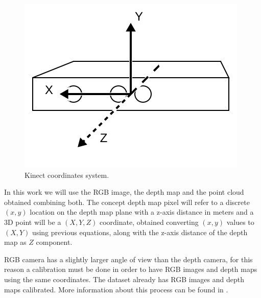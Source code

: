 \begin{figure}[H]
\begin{center}
\includegraphics[scale=0.55]{images/coordinates}
\caption{Kinect coordinates system.}
\label{fig:coordinates}
\end{center}
\end{figure}

In this work we will use the RGB image, the depth map and the point cloud obtained combining both. The concept depth map pixel will 
refer to a discrete $(x,y)$  location on the depth map plane with a z-axis distance in meters and a 3D point will be a $(X,Y,Z)$ coordinate, 
obtained converting $(x,y)$ values to $(X,Y)$ using previous equations, along with the z-axis distance of the depth map as $Z$ component.
 
RGB camera has a slightly larger angle of view than the depth camera, for this reason a calibration must be done 
in order to have RGB images and depth maps using the same coordinates. The dataset already has RGB images and depth maps 
calibrated. More information about 
this process can be found in \cite{sturm12iros}.
